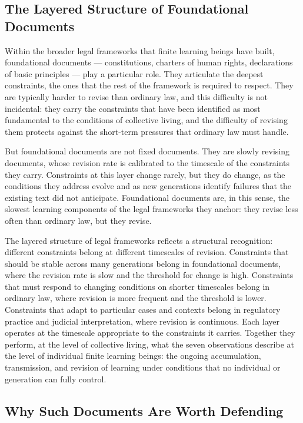 \documentclass[11pt]{article}
\begin{document}
\subsection{The Layered Structure of Foundational Documents}

Within the broader legal frameworks that finite learning beings
have built, foundational documents — constitutions, charters of
human rights, declarations of basic principles — play a
particular role. They articulate the deepest constraints, the
ones that the rest of the framework is required to respect.
They are typically harder to revise than ordinary law, and this
difficulty is not incidental: they carry the constraints that
have been identified as most fundamental to the conditions of
collective living, and the difficulty of revising them protects
against the short-term pressures that ordinary law must handle.

But foundational documents are not fixed documents. They are
slowly revising documents, whose revision rate is calibrated to
the timescale of the constraints they carry. Constraints at this
layer change rarely, but they do change, as the conditions they
address evolve and as new generations identify failures that the
existing text did not anticipate. Foundational documents are, in
this sense, the slowest learning components of the legal
frameworks they anchor: they revise less often than ordinary
law, but they revise.

The layered structure of legal frameworks reflects a structural
recognition: different constraints belong at different
timescales of revision. Constraints that should be stable across
many generations belong in foundational documents, where the
revision rate is slow and the threshold for change is high.
Constraints that must respond to changing conditions on shorter
timescales belong in ordinary law, where revision is more
frequent and the threshold is lower. Constraints that adapt to
particular cases and contexts belong in regulatory practice and
judicial interpretation, where revision is continuous. Each
layer operates at the timescale appropriate to the constraints
it carries. Together they perform, at the level of collective
living, what the seven observations describe at the level of
individual finite learning beings: the ongoing accumulation,
transmission, and revision of learning under conditions that no
individual or generation can fully control.

\subsection{Why Such Documents Are Worth Defending}
\end{document}
